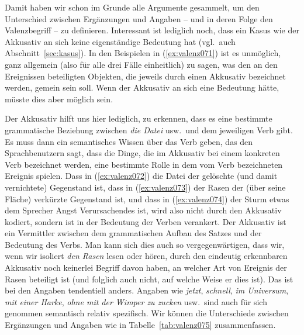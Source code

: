 \begin{exe}
  \ex\label{ex:valenz070}
  \begin{xlist}
  \end{xlist}
\end{exe}

Damit haben wir schon im Grunde alle Argumente gesammelt, um den Unterschied zwischen Ergänzungen und Angaben -- und in deren Folge den Valenzbegriff -- zu definieren.
Interessant ist lediglich noch, dass ein Kasus wie der Akkusativ an sich keine eigenständige Bedeutung hat (vgl.\ auch Abschnitt~\ref{sec:kasus}).
In den Beispielen in (\ref{ex:valenz071}) ist es unmöglich, ganz allgemein (also für alle drei Fälle einheitlich) zu sagen, was den an den Ereignissen beteiligten Objekten, die jeweils durch einen Akkusativ bezeichnet werden, gemein sein soll.
Wenn der Akkusativ an sich eine Bedeutung hätte, müsste dies aber möglich sein.

\begin{exe}
  \ex\label{ex:valenz071}
  \begin{xlist}
  \end{xlist}
\end{exe}

Der Akkusativ hilft uns hier lediglich, zu erkennen, dass es eine bestimmte grammatische Beziehung zwischen \textit{die Datei} usw.\ und dem jeweiligen Verb gibt.
Es muss dann ein semantisches Wissen über das Verb geben, das den Sprachbenutzern sagt, dass die Dinge, die im Akkusativ bei einem konkreten Verb bezeichnet werden, eine bestimmte Rolle in dem vom Verb bezeichneten Ereignis spielen.
Dass in (\ref{ex:valenz072}) die Datei der gelöschte (und damit vernichtete) Gegenstand ist, dass in (\ref{ex:valenz073}) der Rasen der (über seine Fläche) verkürzte Gegenstand ist, und dass in (\ref{ex:valenz074}) der Sturm etwas dem Sprecher Angst Verursachendes ist, wird also nicht durch den Akkusativ kodiert, sondern ist in der Bedeutung der Verben verankert.
Der Akkusativ ist ein Vermittler zwischen dem grammatischen Aufbau des Satzes und der Bedeutung des Verbs.
Man kann sich dies auch so vergegenwärtigen, dass wir, wenn wir isoliert \textit{den Rasen} lesen oder hören, durch den eindeutig erkennbaren Akkusativ noch keinerlei Begriff davon haben, an welcher Art von Ereignis der Rasen beteiligt ist (und folglich auch nicht, auf welche Weise er dies ist).
Das ist bei den Angaben tendentiell anders.
Angaben wie \textit{jetzt}, \textit{schnell}, \textit{im Universum}, \textit{mit einer Harke}, \textit{ohne mit der Wimper zu zucken} usw.\ sind auch für sich genommen semantisch relativ spezifisch.
Wir können die Unterschiede zwischen Ergänzungen und Angaben wie in Tabelle~\ref{tab:valenz075} zusammenfassen.

